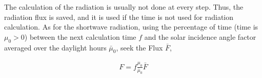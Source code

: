 The calculation of the radiation is usually not done at every step. Thus, the radiation flux is saved, and it is used if the time is not used for radiation calculation. As for the shortwave radiation,
using the percentage of time (time is \(\mu_{0}>0\)) between the next calculation time \(f\) and the solar incidence angle factor averaged over the daylight hours \(\bar{\mu}_{0}\), seek the Flux
\(\bar{F}\),

\begin{eqnarray}
{F}=f \frac{\mu_{0}}{\bar{\mu}_{0}} \bar{F}
\end{eqnarray}
